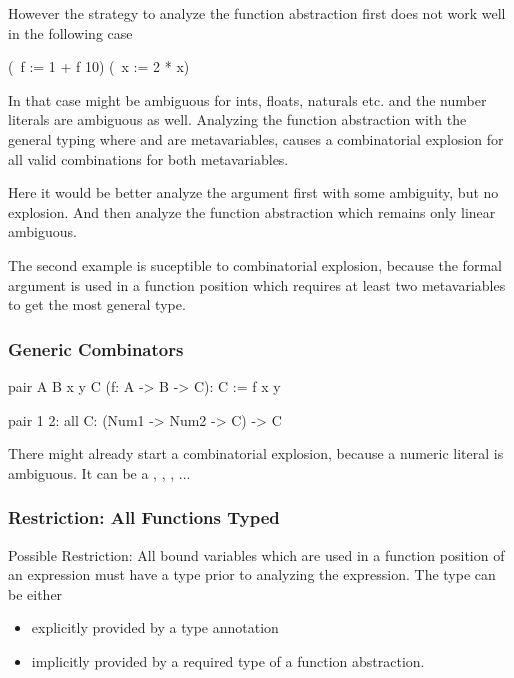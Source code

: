 However the strategy to analyze the function abstraction first does not work
well in the following case
%
\begin{alba}
    (\ f := 1 + f 10) (\ x := 2 * x)
\end{alba}
%
In that case \code{(+)} might be ambiguous for ints, floats, naturals etc. and
the number literals are ambiguous as well. Analyzing the function abstraction
with the general typing  where  and 
are metavariables, causes a combinatorial explosion for all valid combinations
for both metavariables.

Here it would be better analyze the argument first with some ambiguity, but no
explosion. And then analyze the function abstraction which remains only linear
ambiguous.

The second example is suceptible to combinatorial explosion, because the formal
argument  is used in a function position which requires at least two
metavariables to get the most general type.







\vskip 5mm
\subsubsection{Generic Combinators}



\begin{alba}
    pair A B x y C (f: A -> B -> C): C :=
        f x y

    pair 1 2: all C: (Num1 -> Num2 -> C) -> C
\end{alba}

There might already start a combinatorial explosion, because a numeric literal
is ambiguous. It can be a , , ,
 ...




\vskip 5mm
\subsubsection{Restriction: All Functions Typed}

Possible Restriction: All bound variables which are used in a function position
of an expression must have a type prior to analyzing the expression. The type
can be either

\begin{itemize}
\item explicitly provided by a type annotation

\item implicitly provided by a required type of a function abstraction.
\end{itemize}

